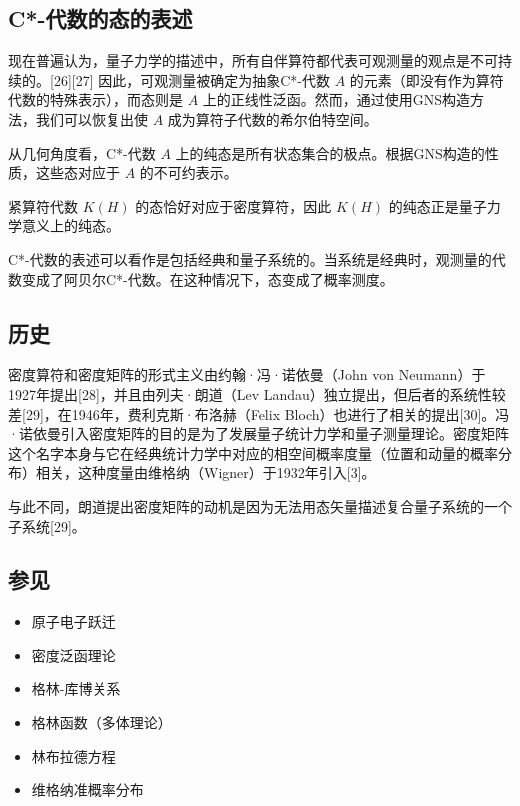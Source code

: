 \subsection{C*-代数的态的表述}
现在普遍认为，量子力学的描述中，所有自伴算符都代表可观测量的观点是不可持续的。[26][27] 因此，可观测量被确定为抽象C*-代数 \( A \) 的元素（即没有作为算符代数的特殊表示），而态则是 \( A \) 上的正线性泛函。然而，通过使用GNS构造方法，我们可以恢复出使 \( A \) 成为算符子代数的希尔伯特空间。

从几何角度看，C*-代数 \( A \) 上的纯态是所有状态集合的极点。根据GNS构造的性质，这些态对应于 \( A \) 的不可约表示。

紧算符代数 \( K(H) \) 的态恰好对应于密度算符，因此 \( K(H) \) 的纯态正是量子力学意义上的纯态。

C*-代数的表述可以看作是包括经典和量子系统的。当系统是经典时，观测量的代数变成了阿贝尔C*-代数。在这种情况下，态变成了概率测度。
\subsection{历史}
密度算符和密度矩阵的形式主义由约翰·冯·诺依曼（John von Neumann）于1927年提出[28]，并且由列夫·朗道（Lev Landau）独立提出，但后者的系统性较差[29]，在1946年，费利克斯·布洛赫（Felix Bloch）也进行了相关的提出[30]。冯·诺依曼引入密度矩阵的目的是为了发展量子统计力学和量子测量理论。密度矩阵这个名字本身与它在经典统计力学中对应的相空间概率度量（位置和动量的概率分布）相关，这种度量由维格纳（Wigner）于1932年引入[3]。

与此不同，朗道提出密度矩阵的动机是因为无法用态矢量描述复合量子系统的一个子系统[29]。
\subsection{参见}
\begin{itemize}
\item 原子电子跃迁
\item 密度泛函理论
\item 格林-库博关系
\item 格林函数（多体理论）
\item 林布拉德方程
\item 维格纳准概率分布
\end{itemize}
